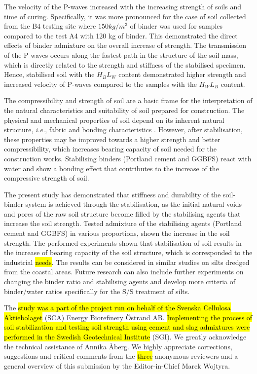 \documentclass{amestyle}
\begin{document}
The velocity of the P-waves increased with the increasing strength of soils and time of curing. Specifically, it was more pronounced for the case of soil collected from the B4 testing site where $150 kg/m^3$ of binder was used for samples compared to the test A4 with 120 kg of binder. This demonstrated the direct effects of binder admixture on the overall increase of strength. The transmission of the P-waves occurs along the fastest path in the structure of the soil mass, which is directly related to the strength and stiffness of the stabilised specimen. Hence, stabilised soil with the $H_BL_W$ content demonstrated higher strength and increased velocity of P-waves compared to the samples with the $H_WL_B$  content.

The compressibility and strength of soil are a basic frame for the interpretation of the natural characteristics and suitability of soil prepared for construction. The physical and mechanical properties of soil depend on its inherent natural structure, \emph{i.e.}, fabric and bonding characteristics \cite{Burland}. However, after stabilisation, these properties may be improved towards a higher strength and better compressibility, which increases bearing capacity of soil needed for the construction works. Stabilising binders (Portland cement and GGBFS) react with water and show a bonding effect that contributes to the increase of the compressive strength of soil. 

The present study has demonstrated that stiffness and durability of the soil-binder system is achieved through the stabilisation, as the initial natural voids and pores of the raw soil structure become filled by the stabilising agents that increase the soil strength. Tested admixture of the stabilising agents (Portland cement and GGBFS) in various proportions, shown the increase in the soil strength. The performed experiments shown that stabilisation of soil results in the increase of bearing capacity of the soil structure, which is corresponded to the industrial \hl{needs}. The results can be considered in similar studies on silts dredged from the coastal areas. Future research can also include further experiments on changing the binder ratio and stabilising agents and develop more criteria of binder/water ratios specifically for the S/S treatment of silts.

\begin{acknowledgements}
The \hl{study was a part of the project run on behalf of the Svenska Cellulosa Aktiebolaget} (SCA) Energy Biorefinery \"Ostrand AB. \hl{Implementing the process of soil stabilization and testing soil strength using cement and slag admixtures were performed in the Swedish Geotechnical Institute} (SGI).
We greatly acknowledge the technical assistance of Annika Åberg. We highly appreciate corrections, suggestions and critical comments from the \hl{three} anonymous reviewers and a general overview of this submission by the Editor-in-Chief Marek Wojtyra.
\end{acknowledgements}
\end{document}
